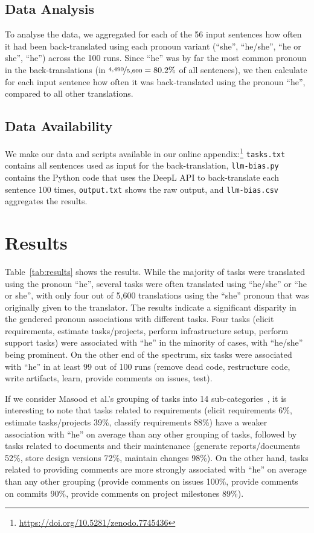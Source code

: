 \documentclass[10pt,conference]{IEEEtran}
\begin{document}
\begin{sloppy}
\subsection{Data Analysis}

To analyse the data, we aggregated for each of the 56 input sentences how often it had been back-translated using each pronoun variant (``she'', ``he/she'', ``he or she'', ``he'') across the 100 runs. Since ``he'' was by far the most common pronoun in the back-translations (in $\nicefrac{4,490}{5,600}=80.2\%$ of all sentences), we then calculate for each input sentence how often it was back-translated using the pronoun ``he'', compared to all other translations.

\subsection{Data Availability}

We make our data and scripts available in our online appendix:\footnote{\url{https://doi.org/10.5281/zenodo.7745436}} \texttt{tasks.txt} contains all sentences used as input for the back-translation, \texttt{llm-bias.py} contains the Python code that uses the DeepL API to back-translate each sentence 100 times, \texttt{output.txt} shows the raw output, and \texttt{llm-bias.csv} aggregates the results.

\section{Results}

Table~\ref{tab:results} shows the results. While the majority of tasks were translated using the pronoun ``he'', several tasks were often translated using ``he/she'' or ``he or she'', with only four out of 5,600 translations using the ``she'' pronoun that was originally given to the translator. The results indicate a significant disparity in the gendered pronoun associations with different tasks. Four tasks (elicit requirements, estimate tasks/projects, perform infrastructure setup, perform support tasks) were associated with ``he'' in the minority of cases, with ``he/she'' being prominent. On the other end of the spectrum, six tasks were associated with ``he'' in at least 99 out of 100 runs (remove dead code, restructure code, write artifacts, learn, provide comments on issues, test).

If we consider Masood et al.'s grouping of tasks into 14 sub-categories~\cite{masood2022like}, it is interesting to note that tasks related to requirements (elicit requirements 6\%, estimate tasks/projects 39\%, classify requirements 88\%) have a weaker association with ``he'' on average than any other grouping of tasks, followed by tasks related to documents and their maintenance (generate reports/documents 52\%, store design versions 72\%, maintain changes 98\%). On the other hand, tasks related to providing comments are more strongly associated with ``he'' on average than any other grouping (provide comments on issues 100\%, provide comments on commits 90\%, provide comments on project milestones 89\%).


\end{sloppy}
\end{document}

